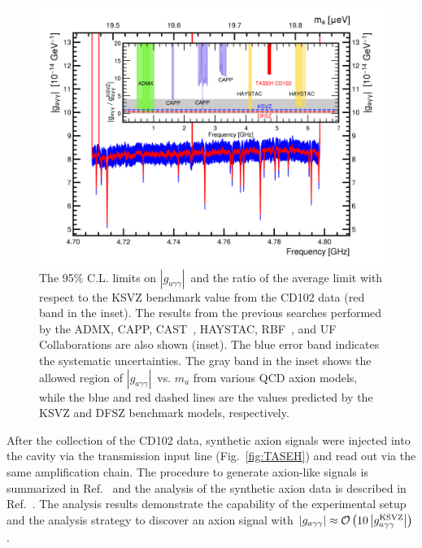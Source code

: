 \documentclass[%
 reprint,prl, %
superscriptaddress,
nobibnotes,
 amsmath,amssymb,
 aps,
]{revtex4-2}
\newcommand{\gagg}{\ensuremath{\left|g_{a\gamma\gamma}\right|}}
\newcommand{\bgagg}{\ensuremath{g_{a\gamma\gamma}}}
\begin{document}
\begin{figure} 
  \centering
  \includegraphics[width=12.9cm]{figures/combineTASEH_all.png}
  \caption{%
The 95\% C.L. limits on \gagg\ and the ratio of the 
average limit with respect to the KSVZ benchmark value 
 from the CD102 data (red band in the inset). The results 
 from the previous searches performed by the 
 ADMX, CAPP, CAST~\cite{CASTI,CASTII}, HAYSTAC, RBF~\cite{RBFI,RBFII}, and 
 UF~\cite{UF} Collaborations are also shown (inset). 
 The blue error band indicates the systematic 
  uncertainties. The gray band in the inset shows the allowed region of 
 \gagg\ vs. $m_a$ 
 from various QCD axion models, while the blue and red dashed lines are the 
values predicted by the KSVZ and DFSZ benchmark models, respectively.
 }

  \label{fig:gaggall}
\end{figure}




After the collection of the CD102 data, 
synthetic axion signals were injected into the cavity via the 
transmission input line (Fig.~\ref{fig:TASEH}) and read out 
via the same amplification chain. 
The procedure to generate axion-like signals is summarized in 
Ref.~\cite{TASEHInstrumentation} and the analysis of the synthetic axion 
data is described in Ref.~\cite{TASEHAnalysis}. 
The analysis results demonstrate 
the capability of the experimental setup and the analysis strategy to discover
an axion signal with 
$\gagg\approx {\cal O}\left(10\left|\bgagg^\text{KSVZ}\right|\right)$.
\end{document}
